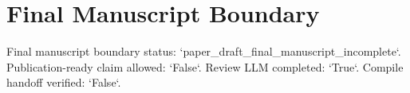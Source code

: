 \section{Final Manuscript Boundary}
Final manuscript boundary status: `paper\_draft\_final\_manuscript\_incomplete`. Publication-ready claim allowed: `False`. Review LLM completed: `True`. Compile handoff verified: `False`.
